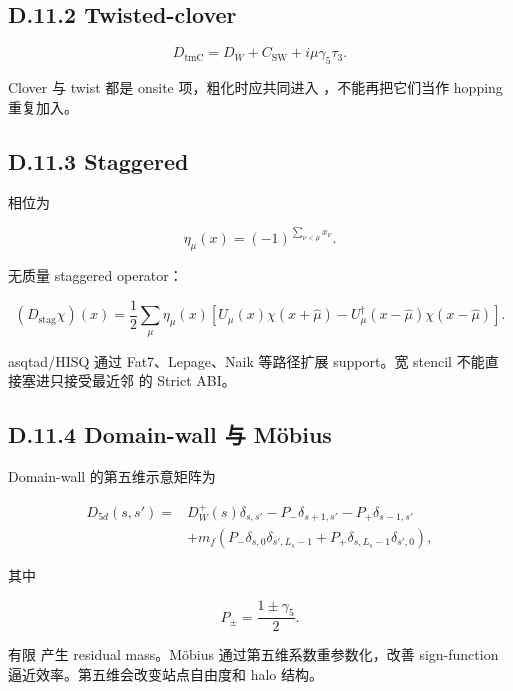 \documentclass[UTF8,a4paper,10pt]{ctexart}
\DeclareRobustCommand{\pycode}[1]{\texorpdfstring{\texttt{\seqsplit{#1}}}{#1}}
\begin{document}
\subsection{D.11.2 Twisted-clover}
\begin{displaymath}
D_{\mathrm{tmC}} =D_W+C_{\mathrm{SW}} +i\mu\gamma_5\tau_3.
\end{displaymath}

Clover 与 twist 都是 onsite 项，粗化时应共同进入 \pycode{X\_c}，不能再把它们当作 hopping 重复加入。

\subsection{D.11.3 Staggered}
相位为

\begin{displaymath}
\eta_\mu(x)=(-1)^{\sum_{\nu<\mu}x_\nu}.
\end{displaymath}

无质量 staggered operator：

\begin{displaymath}
(D_{\mathrm{stag}}\chi)(x) = \frac12\sum_\mu\eta_\mu(x) \left[ U_\mu(x)\chi(x+\hat\mu) -U_\mu^\dagger(x-\hat\mu)\chi(x-\hat\mu) \right].
\end{displaymath}

asqtad/HISQ 通过 Fat7、Lepage、Naik 等路径扩展 support。宽 stencil 不能直接塞进只接受最近邻 \pycode{X/Y} 的 Strict ABI。

\subsection{D.11.4 Domain-wall 与 Möbius}
Domain-wall 的第五维示意矩阵为

\begin{displaymath}
\begin{aligned} D_{5d}(s,s') ={}&D_W^+(s)\delta_{s,s'} -P_-\delta_{s+1,s'} -P_+\delta_{s-1,s'}\\ &+m_f\left( P_-\delta_{s,0}\delta_{s',L_s-1} +P_+\delta_{s,L_s-1}\delta_{s',0} \right), \end{aligned}
\end{displaymath}

其中

\begin{displaymath}
P_\pm=\frac{1\pm\gamma_5}{2}.
\end{displaymath}

有限 \pycode{L\_s} 产生 residual mass。Möbius 通过第五维系数重参数化，改善 sign-function 逼近效率。第五维会改变站点自由度和 halo 结构。
\end{document}
